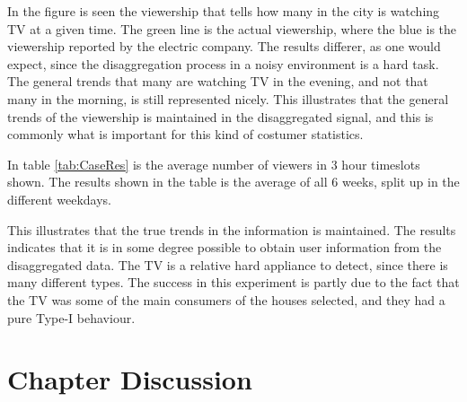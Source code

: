 In the figure is seen the viewership that tells how many in the city is watching TV at a given time. The green line is the actual viewership, where the blue is the viewership reported by the electric company. The results differer, as one would expect, since the disaggregation process in a noisy environment is a hard task. The general trends that many are watching TV in the evening, and not that many in the morning, is still represented nicely. This illustrates that the general trends of the viewership is maintained in the disaggregated signal, and this is commonly what is important for this kind of costumer statistics. 

In table \ref{tab:CaseRes} is the average number of viewers in 3 hour timeslots shown. The results shown in the table is the average of all 6 weeks, split up in the different weekdays. 



This illustrates that the true trends in the information is maintained. The results indicates that it is in some degree possible to obtain user information from the disaggregated data. The TV is a relative hard appliance to detect, since there is many different types. The success in this experiment is partly due to the fact that the TV was some of the main consumers of the houses selected, and they had a pure Type-I behaviour. 

\section{Chapter Discussion}

